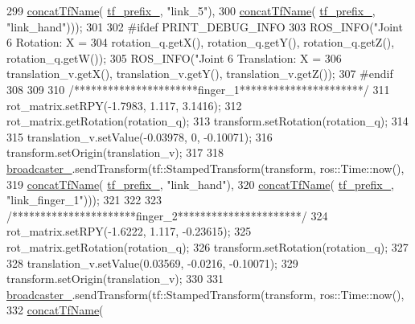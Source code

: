 \begin{DoxyCode}
{{{{{{{{{{{{{{299                                                     \hyperlink{namespacejaco_a6320c11725be13d2957c4e3f474d62f8}{concatTfName}(
      \hyperlink{classjaco_1_1JacoKinematics_a0efb1f0ad1937553c7e285b27da0bdd3}{tf\_prefix\_}, \textcolor{stringliteral}{"link\_5"}),
300                                                     \hyperlink{namespacejaco_a6320c11725be13d2957c4e3f474d62f8}{concatTfName}(
      \hyperlink{classjaco_1_1JacoKinematics_a0efb1f0ad1937553c7e285b27da0bdd3}{tf\_prefix\_}, \textcolor{stringliteral}{"link\_hand"})));
301 
302 \textcolor{preprocessor}{#ifdef PRINT\_DEBUG\_INFO}
303     ROS\_INFO(\textcolor{stringliteral}{"Joint 6 Rotation: X = %
304              rotation\_q.getX(), rotation\_q.getY(), rotation\_q.getZ(), rotation\_q.getW());
305     ROS\_INFO(\textcolor{stringliteral}{"Joint 6 Translation: X = %
306              translation\_v.getX(), translation\_v.getY(), translation\_v.getZ());
307 \textcolor{preprocessor}{#endif}
308 
309 
310     \textcolor{comment}{/**********************finger\_1**********************/}
311     rot\_matrix.setRPY(-1.7983, 1.117, 3.1416);
312     rot\_matrix.getRotation(rotation\_q);
313     transform.setRotation(rotation\_q);
314 
315     translation\_v.setValue(-0.03978, 0, -0.10071);
316     transform.setOrigin(translation\_v);
317 
318     \hyperlink{classjaco_1_1JacoKinematics_a3314f9e6a8fb86405384dd23bd194e46}{broadcaster\_}.sendTransform(tf::StampedTransform(transform, ros::Time::now(),
319                                                     \hyperlink{namespacejaco_a6320c11725be13d2957c4e3f474d62f8}{concatTfName}(
      \hyperlink{classjaco_1_1JacoKinematics_a0efb1f0ad1937553c7e285b27da0bdd3}{tf\_prefix\_}, \textcolor{stringliteral}{"link\_hand"}),
320                                                     \hyperlink{namespacejaco_a6320c11725be13d2957c4e3f474d62f8}{concatTfName}(
      \hyperlink{classjaco_1_1JacoKinematics_a0efb1f0ad1937553c7e285b27da0bdd3}{tf\_prefix\_}, \textcolor{stringliteral}{"link\_finger\_1"})));
321 
322 
323     \textcolor{comment}{/**********************finger\_2**********************/}
324     rot\_matrix.setRPY(-1.6222, 1.117, -0.23615);
325     rot\_matrix.getRotation(rotation\_q);
326     transform.setRotation(rotation\_q);
327 
328     translation\_v.setValue(0.03569, -0.0216, -0.10071);
329     transform.setOrigin(translation\_v);
330 
331     \hyperlink{classjaco_1_1JacoKinematics_a3314f9e6a8fb86405384dd23bd194e46}{broadcaster\_}.sendTransform(tf::StampedTransform(transform, ros::Time::now(),
332                                                     \hyperlink{namespacejaco_a6320c11725be13d2957c4e3f474d62f8}{concatTfName}(
}}}}}}}}}}}}}}}}
\end{DoxyCode}
